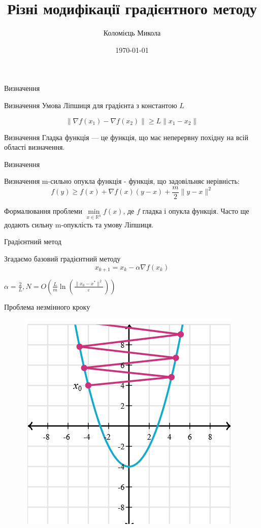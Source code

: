 \documentclass[a4paper, 14pt]{beamer}
\title{Різні модифікації градієнтного методу}
\author{Коломієць Микола}
\date{\today}
\begin{document}
\maketitle

\begin{frame}{Визначення}

    \begin{statement}{Визначення}
        Умова Ліпшиця для градієнта з константою $L$

        $$\| \nabla f(x_1) - \nabla f(x_2) \| \geq L \|x_1 - x_2 \| $$
    \end{statement}
    
    \begin{statement}{Визначення}
        Гладка функція — це функція, що має неперервну похідну 
        на всій області визначення.
    \end{statement}

\end{frame}

\begin{frame}{Визначення}
    \begin{statement}{Визначення}
        m-сильно опукла функція - функція, що задовільняє нерівність:
        $$ f(y) \geq f(x) + \nabla f(x) (y - x) + \frac{m}{2}\|y - x\|^2 $$
    \end{statement}
\end{frame}

\begin{frame}{Формалювання проблеми}
    $\min\limits_{x \in \mathbb{R}^n}f(x)$, 
    де $f$ гладка і опукла функція. 
    Часто ще додають сильну m-опуклість та умову Ліпшиця. 

\end{frame}
\begin{frame}{Градієнтний метод}

    Згадаємо базовий градієнтний методу
    $$x_{k+1} = x_k -\alpha \nabla f(x_k)$$

    $\alpha = \frac{2}{L}, N = O(\frac{L}{m}
    \ln(\frac{\|x_0 - x^*\|^2}{\varepsilon}))$
\end{frame}

\begin{frame}{Проблема незмінного кроку}
    \begin{figure}
        \includegraphics[width = 0.5 \textwidth]{imgs/problem_step_size.png}
    \end{figure}
    
\end{frame}
\end{document}
